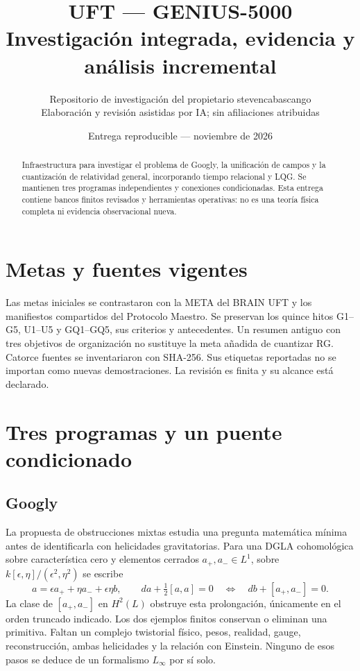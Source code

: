 \documentclass[11pt,a4paper]{article}
\title{UFT --- GENIUS-5000\\Investigación integrada, evidencia y análisis incremental}
\author{Repositorio de investigación del propietario stevencabascango\\Elaboración y revisión asistidas por IA; sin afiliaciones atribuidas}
\date{Entrega reproducible --- noviembre de 2026}
\begin{document}
\maketitle
\begin{abstract}
Infraestructura para investigar el problema de Googly, la unificación de campos
y la cuantización de relatividad general, incorporando tiempo relacional y LQG.
Se mantienen tres programas independientes y conexiones condicionadas. Esta
entrega contiene bancos finitos revisados y herramientas operativas: no es una
teoría física completa ni evidencia observacional nueva.
\end{abstract}
\tableofcontents\newpage
\section{Metas y fuentes vigentes}
Las metas iniciales se contrastaron con la META del BRAIN UFT y los manifiestos
compartidos del Protocolo Maestro. Se preservan los quince hitos G1--G5, U1--U5 y
GQ1--GQ5, sus criterios y antecedentes. Un resumen antiguo con tres objetivos de
organización no sustituye la meta añadida de cuantizar RG. Catorce fuentes se
inventariaron con SHA-256. Sus etiquetas reportadas no se importan como nuevas
demostraciones. La revisión es finita y su alcance está declarado.

\section{Tres programas y un puente condicionado}
\subsection{Googly}
La propuesta de obstrucciones mixtas estudia una pregunta matemática mínima antes
de identificarla con helicidades gravitatorias. Para una DGLA cohomológica sobre
característica cero y elementos cerrados $a_+,a_-\in L^1$, sobre
$k[\epsilon,\eta]/(\epsilon^2,\eta^2)$ se escribe
\[
 a=\epsilon a_++\eta a_-+\epsilon\eta b,\qquad
 da+\tfrac12[a,a]=0
 \quad\Longleftrightarrow\quad db+[a_+,a_-]=0.
\]
La clase de $[a_+,a_-]$ en $H^2(L)$ obstruye esta prolongación, únicamente en el
orden truncado indicado. Los dos ejemplos finitos conservan o eliminan una
primitiva. Faltan un complejo twistorial físico, pesos, realidad, gauge,
reconstrucción, ambas helicidades y la relación con Einstein. Ninguno de esos
pasos se deduce de un formalismo $L_\infty$ por sí solo.
\end{document}
